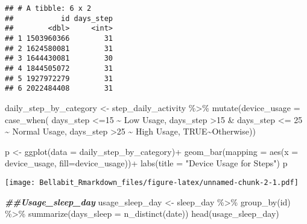 \documentclass[
]{article}
\newenvironment{Shaded}{\begin{snugshade}}{\end{snugshade}}
\newcommand{\AttributeTok}[1]{\textcolor[rgb]{0.77,0.63,0.00}{#1}}
\newcommand{\ConstantTok}[1]{\textcolor[rgb]{0.00,0.00,0.00}{#1}}
\newcommand{\DecValTok}[1]{\textcolor[rgb]{0.00,0.00,0.81}{#1}}
\newcommand{\DocumentationTok}[1]{\textcolor[rgb]{0.56,0.35,0.01}{\textbf{\textit{#1}}}}
\newcommand{\FunctionTok}[1]{\textcolor[rgb]{0.00,0.00,0.00}{#1}}
\newcommand{\NormalTok}[1]{#1}
\newcommand{\OtherTok}[1]{\textcolor[rgb]{0.56,0.35,0.01}{#1}}
\newcommand{\SpecialCharTok}[1]{\textcolor[rgb]{0.00,0.00,0.00}{#1}}
\newcommand{\StringTok}[1]{\textcolor[rgb]{0.31,0.60,0.02}{#1}}
\begin{document}
\begin{verbatim}
## # A tibble: 6 x 2
##           id days_step
##        <dbl>     <int>
## 1 1503960366        31
## 2 1624580081        31
## 3 1644430081        30
## 4 1844505072        31
## 5 1927972279        31
## 6 2022484408        31
\end{verbatim}

\begin{Shaded}
\begin{Highlighting}[]
\NormalTok{daily\_step\_by\_category }\OtherTok{\textless{}{-}}\NormalTok{ step\_daily\_activity }\SpecialCharTok{\%\textgreater{}\%}
  \FunctionTok{mutate}\NormalTok{(}\AttributeTok{device\_usage =} \FunctionTok{case\_when}\NormalTok{(}
\NormalTok{    days\_step }\SpecialCharTok{\textless{}=}\DecValTok{15} \SpecialCharTok{\textasciitilde{}} \StringTok{\textquotesingle{}Low Usage\textquotesingle{}}\NormalTok{,}
\NormalTok{    days\_step }\SpecialCharTok{\textgreater{}}\DecValTok{15} \SpecialCharTok{\&}\NormalTok{ days\_step }\SpecialCharTok{\textless{}=} \DecValTok{25} \SpecialCharTok{\textasciitilde{}} \StringTok{\textquotesingle{}Normal Usage\textquotesingle{}}\NormalTok{,}
\NormalTok{    days\_step }\SpecialCharTok{\textgreater{}}\DecValTok{25} \SpecialCharTok{\textasciitilde{}} \StringTok{\textquotesingle{}High Usage\textquotesingle{}}\NormalTok{,}
    \ConstantTok{TRUE}\SpecialCharTok{\textasciitilde{}}\StringTok{\textquotesingle{}Otherwise\textquotesingle{}}\NormalTok{))}

\NormalTok{p }\OtherTok{\textless{}{-}} \FunctionTok{ggplot}\NormalTok{(}\AttributeTok{data =}\NormalTok{ daily\_step\_by\_category)}\SpecialCharTok{+}
  \FunctionTok{geom\_bar}\NormalTok{(}\AttributeTok{mapping =} \FunctionTok{aes}\NormalTok{(}\AttributeTok{x =}\NormalTok{ device\_usage, }\AttributeTok{fill=}\NormalTok{device\_usage))}\SpecialCharTok{+}
  \FunctionTok{labs}\NormalTok{(}\AttributeTok{title =} \StringTok{"Device Usage for Steps"}\NormalTok{)}
\NormalTok{p}
\end{Highlighting}
\end{Shaded}

\texttt{[image: Bellabit\_Rmarkdown\_files/figure-latex/unnamed-chunk-2-1.pdf]}

\begin{Shaded}
\begin{Highlighting}[]
\DocumentationTok{\#\#Usage\_sleep\_day}
\NormalTok{usage\_sleep\_day }\OtherTok{\textless{}{-}}\NormalTok{ sleep\_day }\SpecialCharTok{\%\textgreater{}\%}
  \FunctionTok{group\_by}\NormalTok{(id) }\SpecialCharTok{\%\textgreater{}\%}
  \FunctionTok{summarize}\NormalTok{(}\AttributeTok{days\_sleep =} \FunctionTok{n\_distinct}\NormalTok{(date))}
\FunctionTok{head}\NormalTok{(usage\_sleep\_day)}
\end{Highlighting}
\end{Shaded}
\end{document}
